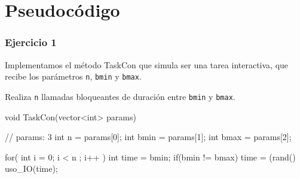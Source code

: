 \part{Pseudoc\'odigo}

\section{Ejercicio 1}

Implementamos el m\'etodo TaskCon que simula ser una tarea interactiva, que recibe los par\'ametros \verb|n|, \verb|bmin| y \verb|bmax|.

Realiza \verb|n| llamadas bloqueantes de duraci\'on entre \verb|bmin| y \verb|bmax|.

\begin{framed}
\begin{verbatimtab}
void TaskCon(vector<int> params) { // params: 3
	int n = params[0];
	int bmin = params[1];
	int bmax = params[2];
	
	for( int i = 0; i < n ; i++ ) {
		int time = bmin;
		if(bmin != bmax)
			time = (rand()%
		uso_IO(time);
	}
}
\end{verbatimtab}
\end{framed}
